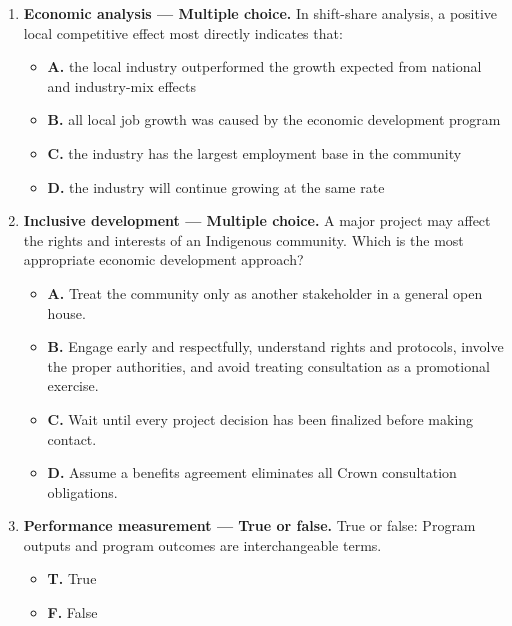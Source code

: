 \documentclass[11pt,letterpaper,oneside,openany]{book}
\begin{document}
\begin{enumerate}[leftmargin=*,itemsep=1.1em]
\begin{itemize}[leftmargin=1.7em]
\item \textbf{C.} New wages paid to local workers because of the project.
\item \textbf{D.} Incremental municipal revenue attributable to the project.
\end{itemize}
\item \textbf{Economic analysis --- Multiple choice.} In shift-share analysis, a positive local competitive effect most directly indicates that:
\begin{itemize}[leftmargin=1.7em]
\item \textbf{A.} the local industry outperformed the growth expected from national and industry-mix effects
\item \textbf{B.} all local job growth was caused by the economic development program
\item \textbf{C.} the industry has the largest employment base in the community
\item \textbf{D.} the industry will continue growing at the same rate
\end{itemize}
\item \textbf{Inclusive development --- Multiple choice.} A major project may affect the rights and interests of an Indigenous community. Which is the most appropriate economic development approach?
\begin{itemize}[leftmargin=1.7em]
\item \textbf{A.} Treat the community only as another stakeholder in a general open house.
\item \textbf{B.} Engage early and respectfully, understand rights and protocols, involve the proper authorities, and avoid treating consultation as a promotional exercise.
\item \textbf{C.} Wait until every project decision has been finalized before making contact.
\item \textbf{D.} Assume a benefits agreement eliminates all Crown consultation obligations.
\end{itemize}
\item \textbf{Performance measurement --- True or false.} True or false: Program outputs and program outcomes are interchangeable terms.
\begin{itemize}[leftmargin=1.7em]
\item \textbf{T.} True
\item \textbf{F.} False
\end{itemize}

\end{enumerate}
\end{document}
